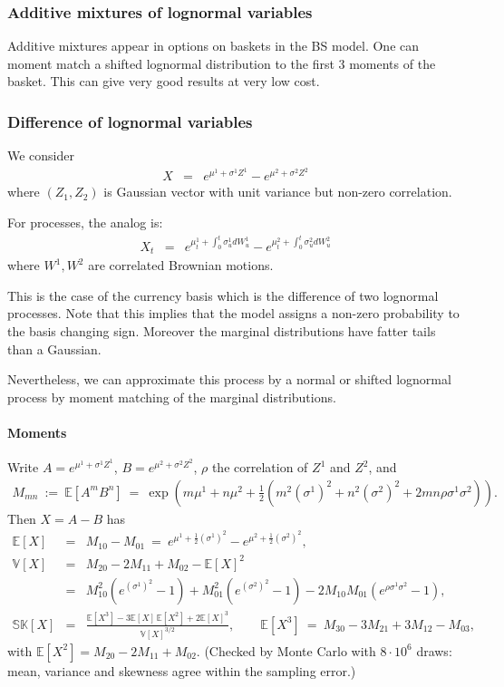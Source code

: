 \documentclass[11pt,english]{amsart}
\newcommand{\EE}{\mathbb{E}}
\newcommand{\VV}{\mathbb{V}}
\theoremstyle{definition}
\begin{document}
\subsubsection{Additive mixtures of lognormal variables}

Additive mixtures appear in options on baskets in the BS model. One can moment match a shifted lognormal distribution to the first 3 moments of the basket. This can give very good results at very low cost. 


\subsubsection{Difference of lognormal variables}
We consider 
\begin{eqnarray}
  X &=& e^{\mu^1 + \sigma^1 Z^1} - e^{\mu^2 + \sigma^2 Z^2} 
\end{eqnarray}
where $(Z_1,Z_2)$ is Gaussian vector with unit variance but non-zero correlation. 

For processes, the analog is:
\begin{eqnarray}
  X_t &=& e^{\mu^1_t +  \int_0^t \sigma^1_u dW^1_u} - e^{\mu^2_t + \int_0^t \sigma^2_u dW^2_u} 
\end{eqnarray}
where $W^1,W^2$ are correlated Brownian motions. 

This is the case of the currency basis which is the difference of two lognormal processes. Note that this implies that the model assigns a non-zero probability to the basis changing sign. Moreover the marginal distributions have fatter tails than a Gaussian. 

Nevertheless, we can approximate this process by a normal or shifted lognormal process by moment matching of the marginal distributions.

\paragraph{Moments}
Write $A = e^{\mu^1+\sigma^1Z^1}$, $B = e^{\mu^2+\sigma^2Z^2}$, $\rho$ the correlation of $Z^1$ and $Z^2$, and
\begin{eqnarray*}
  M_{mn} ~:=~ \EE[A^mB^n] ~=~ \exp\left( m\mu^1 + n\mu^2 + \tfrac12\left( m^2(\sigma^1)^2 + n^2(\sigma^2)^2 + 2mn\rho\sigma^1\sigma^2 \right) \right) .
\end{eqnarray*}
Then $X = A - B$ has
\begin{eqnarray}
  \EE[X] &=& M_{10} - M_{01} ~=~ e^{\mu^1 +  \frac{1}{2} (\sigma^1)^2} - e^{\mu^2 +  \frac{1}{2} (\sigma^2)^2} , \\
  \VV[X] &=& M_{20} - 2M_{11} + M_{02} - \EE[X]^2 \nonumber \\
  &=& M_{10}^2\left(e^{(\sigma^1)^2}-1\right) + M_{01}^2\left(e^{(\sigma^2)^2}-1\right) - 2M_{10}M_{01}\left(e^{\rho\sigma^1\sigma^2}-1\right) , \\
  \mathbb{SK}[X] &=& \frac{\EE[X^3] - 3\EE[X]\,\EE[X^2] + 2\EE[X]^3}{\VV[X]^{3/2}} , \qquad
  \EE[X^3] ~=~ M_{30} - 3M_{21} + 3M_{12} - M_{03} ,
\end{eqnarray}
with $\EE[X^2] = M_{20} - 2M_{11} + M_{02}$. (Checked by Monte Carlo with $8\cdot10^6$ draws: mean, variance and skewness agree within the sampling error.)
\end{document}
